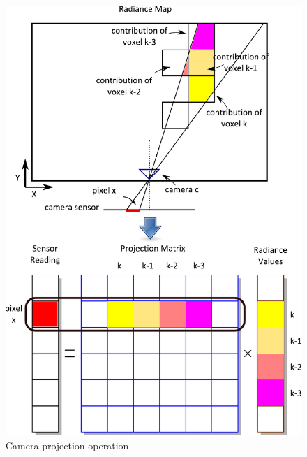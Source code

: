 \documentclass[10pt,twocolumn,letterpaper]{article}
\begin{document}
\begin{figure}

  \centering
    \includegraphics[width=\columnwidth]{images/sensor.pdf}
  \caption{Camera projection operation}
  \label{fig:projection}
\end{figure}
\end{document}
